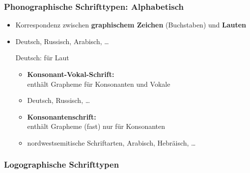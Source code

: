 \begin{frame}
\frametitle{Phonographische Schrifttypen: Alphabetisch}


\begin{itemize}

	\item Korrespondenz zwischen \textbf{graphischem Zeichen} (Buchstaben) und \textbf{Lauten}
	\item Deutsch, Russisch, Arabisch, \dots
	
	\ea Deutsch:  für Laut \textipa{[t]}
	\z 
	
	\pause 
	
	\begin{itemize}
		\item \textbf{Konsonant-Vokal-Schrift:} \\
		enthält Grapheme für Konsonanten und Vokale
		\item Deutsch, Russisch, \dots
		
		\item \textbf{Konsonantenschrift:}\\
		enthält Grapheme (fast) nur für Konsonanten \citep[vgl.][358]{Glueck16b} 
		\item nordwestsemitische Schriftarten, Arabisch, Hebräisch, \dots
	\end{itemize}
	
	\end{itemize}

\end{frame}


\subsubsection{Logographische Schrifttypen}

